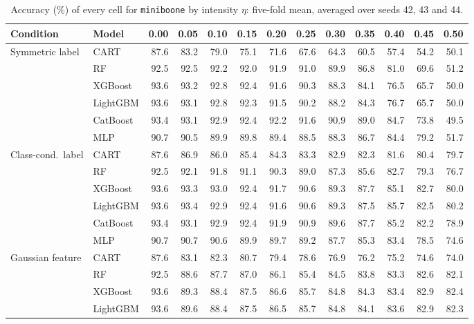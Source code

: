 \begin{table}[p]
\centering
\tiny
\setlength{\tabcolsep}{2.6pt}
\caption{Accuracy (\%) of every cell for \texttt{miniboone} by intensity $\eta$: five-fold mean, averaged over seeds 42, 43 and 44.}
\label{tab:grid_miniboone}
\begin{tabular}{@{}llrrrrrrrrrrr@{}}
\toprule
Condition & Model & 0.00 & 0.05 & 0.10 & 0.15 & 0.20 & 0.25 & 0.30 & 0.35 & 0.40 & 0.45 & 0.50 \\
\midrule
Symmetric label & CART & 87.6 & 83.2 & 79.0 & 75.1 & 71.6 & 67.6 & 64.3 & 60.5 & 57.4 & 54.2 & 50.1 \\
 & RF & 92.5 & 92.5 & 92.2 & 92.0 & 91.9 & 91.0 & 89.9 & 86.8 & 81.0 & 69.6 & 51.2 \\
 & XGBoost & 93.6 & 93.2 & 92.8 & 92.4 & 91.6 & 90.3 & 88.3 & 84.1 & 76.5 & 65.7 & 50.0 \\
 & LightGBM & 93.6 & 93.1 & 92.8 & 92.3 & 91.5 & 90.2 & 88.2 & 84.3 & 76.7 & 65.7 & 50.0 \\
 & CatBoost & 93.4 & 93.1 & 92.9 & 92.4 & 92.2 & 91.6 & 90.9 & 89.0 & 84.7 & 73.8 & 49.5 \\
 & MLP & 90.7 & 90.5 & 89.9 & 89.8 & 89.4 & 88.5 & 88.3 & 86.7 & 84.4 & 79.2 & 51.7 \\
\midrule
Class-cond.\ label & CART & 87.6 & 86.9 & 86.0 & 85.4 & 84.3 & 83.3 & 82.9 & 82.3 & 81.6 & 80.4 & 79.7 \\
 & RF & 92.5 & 92.1 & 91.8 & 91.1 & 90.3 & 89.0 & 87.3 & 85.6 & 82.7 & 79.3 & 76.7 \\
 & XGBoost & 93.6 & 93.3 & 93.0 & 92.4 & 91.7 & 90.6 & 89.3 & 87.7 & 85.1 & 82.7 & 80.0 \\
 & LightGBM & 93.6 & 93.4 & 92.9 & 92.4 & 91.6 & 90.6 & 89.3 & 87.5 & 85.7 & 82.5 & 80.2 \\
 & CatBoost & 93.4 & 93.1 & 92.9 & 92.4 & 91.9 & 90.9 & 89.6 & 87.7 & 85.2 & 82.2 & 78.9 \\
 & MLP & 90.7 & 90.7 & 90.6 & 89.9 & 89.7 & 89.2 & 87.7 & 85.3 & 83.4 & 78.5 & 74.6 \\
\midrule
Gaussian feature & CART & 87.6 & 83.1 & 82.3 & 80.7 & 79.4 & 78.6 & 76.9 & 76.2 & 75.2 & 74.6 & 74.0 \\
 & RF & 92.5 & 88.6 & 87.7 & 87.0 & 86.1 & 85.4 & 84.5 & 83.8 & 83.3 & 82.6 & 82.1 \\
 & XGBoost & 93.6 & 89.3 & 88.4 & 87.5 & 86.6 & 85.7 & 84.8 & 84.3 & 83.4 & 82.9 & 82.4 \\
 & LightGBM & 93.6 & 89.6 & 88.4 & 87.5 & 86.5 & 85.7 & 84.8 & 84.1 & 83.6 & 82.9 & 82.3 \\

\end{tabular}
\end{table}
